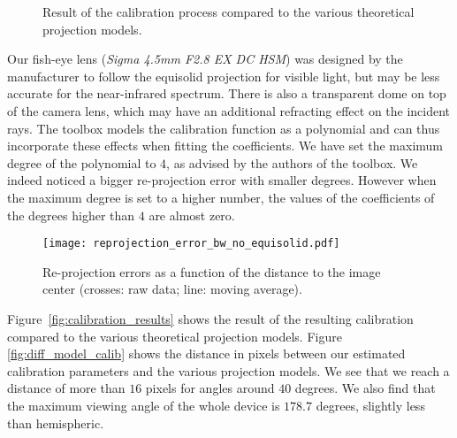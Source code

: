 \begin{figure}[htbp]
\centering
{}
\hspace{0.2cm}
\caption{Result of the calibration process compared to the various theoretical projection models.}
\end{figure}

Our fish-eye lens (\emph{Sigma 4.5mm F2.8 EX DC HSM}) was designed by the manufacturer to follow the equisolid projection for visible light, but may be less accurate for the near-infrared spectrum. There is also a transparent dome on top of the camera lens, which may have an additional refracting effect on the incident rays. The toolbox models the calibration function as a polynomial and can thus incorporate these effects when fitting the coefficients.  We have set the maximum degree of the polynomial to $4$, as advised by the authors of the toolbox. We indeed noticed a bigger re-projection error with smaller degrees. However when the maximum degree is set to a higher number, the values of the coefficients of the degrees higher than $4$ are almost zero.

\begin{figure}[htbp]
\begin{center}
\texttt{[image: reprojection\_error\_bw\_no\_equisolid.pdf]}
\caption[Re-projection errors as a function of the distance to the image center.]{Re-projection errors as a function of the distance to the image center (crosses: raw data; line: moving average).\label{fig:reprojection_error_bw}}
\end{center}
\end{figure}

Figure~\ref{fig:calibration_results} shows the result of the resulting calibration compared to the various theoretical projection models. Figure \ref{fig:diff_model_calib} shows the distance in pixels between our estimated calibration parameters and the various projection models. We see that we reach a distance of more than $16$ pixels for angles around $40$ degrees. We also find that the maximum viewing angle of the whole device is $178.7$ degrees, slightly less than hemispheric.


